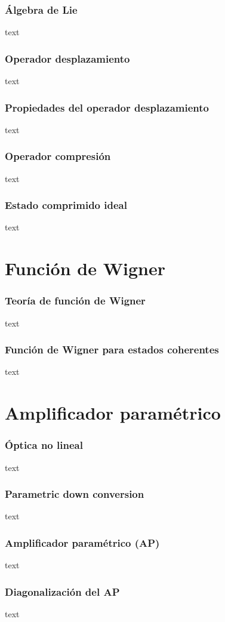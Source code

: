 \documentclass[xcolor=dvipsnames,slidestop,compress,mathserif, 11pt]{beamer}
\begin{document}
\begin{frame}[c]
	\frametitle{Álgebra de Lie}
	text
\end{frame}

\begin{frame}[c]
	\frametitle{Operador desplazamiento}
	text
\end{frame}

\begin{frame}[c]
	\frametitle{Propiedades del operador desplazamiento}
	text
\end{frame}

\begin{frame}[c]
	\frametitle{Operador compresión}
	text
\end{frame}

\begin{frame}[c]
	\frametitle{Estado comprimido ideal}
	text
\end{frame}

\section{Función de Wigner}

\begin{frame}[c]
	\frametitle{Teoría de función de Wigner}
	text
\end{frame}

\begin{frame}[c]
	\frametitle{Función de Wigner para estados coherentes}
	text
\end{frame}

\section{Amplificador paramétrico}

\begin{frame}[c]
	\frametitle{Óptica no lineal}
	text
\end{frame}

\begin{frame}[c]
	\frametitle{Parametric down conversion}
	text
\end{frame}

\begin{frame}[c]
	\frametitle{Amplificador paramétrico (AP)}
	text
\end{frame}

\begin{frame}[c]
	\frametitle{Diagonalización del AP}
	text
\end{frame}
\end{document}
